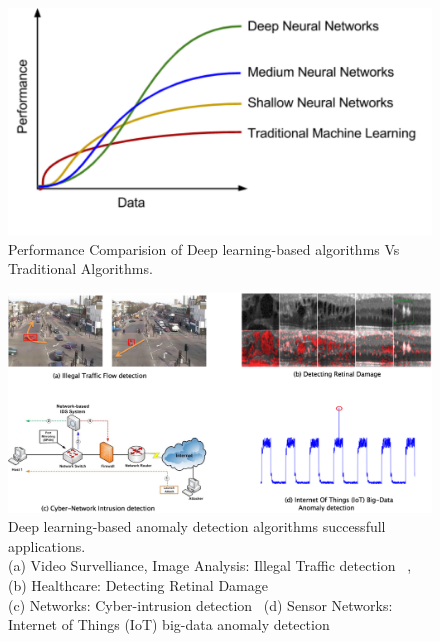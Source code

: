 
\begin{figure}[h]
\includegraphics[scale=0.5]{images/traditionalVsDeepLearning}
\captionsetup{justification=centering}
\caption{Performance Comparision of Deep learning-based algorithms Vs Traditional Algorithms.}
\label{fig:performanceCompare}
\end{figure}


\begin{figure}[h]
\includegraphics[scale=0.5]{images/applications}
\captionsetup{justification=centering}
\caption{Deep learning-based anomaly detection algorithms successfull applications.\\
(a) Video Survelliance, Image Analysis: Illegal Traffic detection~\cite{xie2017real}  ,  (b) Healthcare: Detecting Retinal Damage~\cite{schlegl2017unsupervised}\\
(c) Networks: Cyber-intrusion detection~\cite{javaid2016deep}  (d) Sensor Networks: Internet of Things (IoT) big-data anomaly detection~\cite{mohammadi2017deep} }
\label{fig:applications}
\end{figure}

